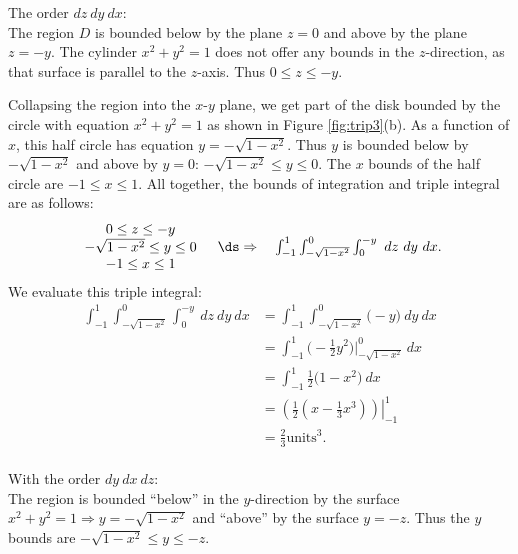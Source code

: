 {The order $dz\ dy\ dx$:\\

The region $D$ is bounded below by the plane $z=0$ and above by the plane $z=-y$. The cylinder $x^2+y^2=1$ does not offer any bounds in the $z$-direction, as that surface is parallel to the $z$-axis. Thus $0\leq z\leq -y$.

Collapsing the region into the $x$-$y$ plane, we get part of the disk bounded by the circle with equation $x^2+y^2=1$ as shown in Figure \ref{fig:trip3}(b). As a function of $x$, this half circle has equation $y=-\sqrt{1-x^2}$. Thus $y$ is bounded below by $-\sqrt{1-x^2}$ and above by $y=0$: $-\sqrt{1-x^2}\leq y\leq 0$. The $x$ bounds of the half circle are $-1\leq x\leq 1$. All together, the bounds of integration and triple integral are  as follows:
$$\begin{array}{cc}
		\begin{array}{c}
		0\leq z\leq -y\\
		-\sqrt{1-x^2}\leq y\leq 0\\
		-1\leq x\leq 1
		\end{array} 
		&
		\ds\Rightarrow \quad \int_{-1}^1\int_{-\sqrt{1-x^2}}^{0}\int_0^{-y}\ dz\ dy\ dx.
	\end{array}
$$
We evaluate this triple integral:
\begin{align*}
\int_{-1}^1\int_{-\sqrt{1-x^2}}^{0}\int_0^{-y}\ dz\ dy\ dx &= \int_{-1}^1\int_{-\sqrt{1-x^2}}^{0}\big(-y\big)\ dy\ dx\\
				&=\int_{-1}^1\big(-\frac12y^2\big)\Big|_{-\sqrt{1-x^2}}^{0}\ dx\\
				&= \int_{-1}^1 \frac12\big(1-x^2\big)\ dx\\
				&= \left.\left(\frac12\left(x-\frac13x^3\right)\right)\right|_{-1}^1\\
				&= \frac23\text{units}^3.
\end{align*}\\
\clearpage
\noindent With the order $dy\ dx\ dz$:\\

The region is bounded ``below'' in the $y$-direction by the surface $x^2+y^2=1 \Rightarrow y=-\sqrt{1-x^2}$ and ``above'' by the surface $y=-z$. Thus the $y$ bounds are $-\sqrt{1-x^2}\leq y\leq -z$.


}
